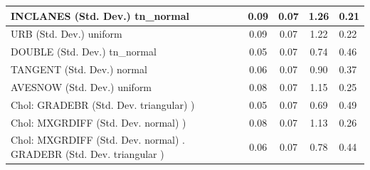 \begin{table}
\begin{center}
\begin{tabular}{|l|l|c|c|c|l|}
			INCLANES (Std. Dev.) tn_normal &  & 0.09 & 0.07 & 1.26 & 0.21 \\
			\hline
			URB (Std. Dev.) uniform &  & 0.09 & 0.07 & 1.22 & 0.22 \\
			\hline
			DOUBLE (Std. Dev.) tn_normal &  & 0.05 & 0.07 & 0.74 & 0.46 \\
			\hline
			TANGENT (Std. Dev.) normal &  & 0.06 & 0.07 & 0.90 & 0.37 \\
			\hline
			AVESNOW (Std. Dev.) uniform &  & 0.08 & 0.07 & 1.15 & 0.25 \\
			\hline
			 Chol: GRADEBR (Std. Dev. triangular) ) &  & 0.05 & 0.07 & 0.69 & 0.49 \\
			\hline
			 Chol: MXGRDIFF (Std. Dev. normal) ) &  & 0.08 & 0.07 & 1.13 & 0.26 \\
			\hline
			 Chol: MXGRDIFF (Std. Dev. normal) . GRADEBR (Std. Dev.   triangular ) &  & 0.06 & 0.07 & 0.78 & 0.44 \\
			\hline
		\end{tabular}
	\end{center}
\end{table}